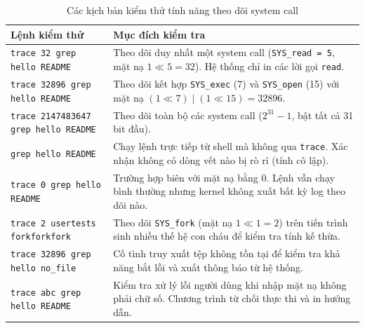 \begin{table}[htbp]
    \centering
    \small
    \renewcommand{\arraystretch}{1.3}
    \begin{tabularx}{\textwidth}{p{} X}
        \toprule
        \textbf{Lệnh kiểm thử} & \textbf{Mục đích kiểm tra} \\
        \midrule
        \texttt{trace 32 grep hello README} 
            & Theo dõi duy nhất một system call (\texttt{SYS\_read = 5}, mặt nạ $1 \ll 5 = 32$). Hệ thống chỉ in các lời gọi \texttt{read}. \\
        \texttt{trace 32896 grep hello README} 
            & Theo dõi kết hợp \texttt{SYS\_exec} (7) và \texttt{SYS\_open} (15) với mặt nạ $(1 \ll 7) \mid (1 \ll 15) = 32896$. \\
        \texttt{trace 2147483647 grep hello README} 
            & Theo dõi toàn bộ các system call ($2^{31} - 1$, bật tất cả 31 bit đầu). \\
        \texttt{grep hello README} 
            & Chạy lệnh trực tiếp từ shell mà không qua \texttt{trace}. Xác nhận không có dòng vết nào bị rò rỉ (tính cô lập). \\
        \texttt{trace 0 grep hello README} 
            & Trường hợp biên với mặt nạ bằng 0. Lệnh vẫn chạy bình thường nhưng kernel không xuất bất kỳ log theo dõi nào. \\
        \texttt{trace 2 usertests forkforkfork} 
            & Theo dõi \texttt{SYS\_fork} (mặt nạ $1 \ll 1 = 2$) trên tiến trình sinh nhiều thế hệ con cháu để kiểm tra tính kế thừa. \\
        \texttt{trace 32896 grep hello no\_file} 
            & Cố tình truy xuất tệp không tồn tại để kiểm tra khả năng bắt lỗi và xuất thông báo từ hệ thống. \\
        \texttt{trace abc grep hello README} 
            & Kiểm tra xử lý lỗi người dùng khi nhập mặt nạ không phải chữ số. Chương trình từ chối thực thi và in hướng dẫn. \\
        \bottomrule
    \end{tabularx}
    \caption{Các kịch bản kiểm thử tính năng theo dõi system call}
    \label{tab:trace_testcases}
\end{table}

